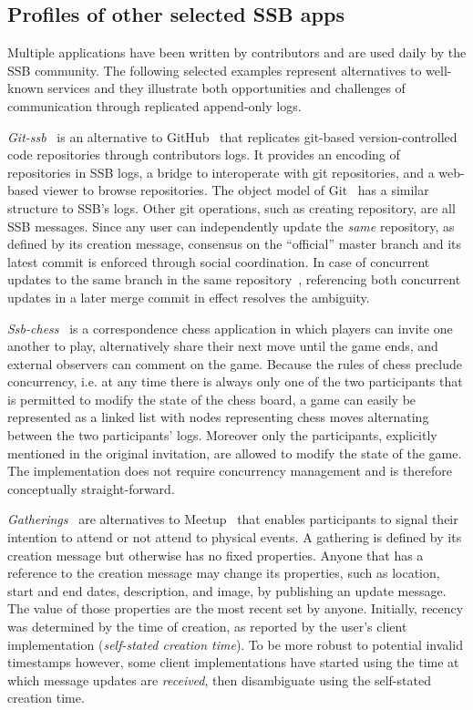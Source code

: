\documentclass[9pt,sigconf]{acmart}
\begin{document}
\subsection{Profiles of other selected SSB apps}
\label{Section:AppProfiles}

Multiple applications have been written by contributors and are used daily by
the SSB community. The following selected examples represent
alternatives to well-known services and they illustrate both opportunities and
challenges of communication through replicated append-only logs.

\textit{Git-ssb}~\cite{git-ssb} is an alternative to GitHub~\cite{github} that
replicates git-based version-controlled code repositories through contributors
logs. It provides an encoding of repositories in SSB logs, a bridge to
interoperate with git repositories, and a web-based viewer to browse
repositories. The object model of Git~\cite{chacon2014pro} has a similar
structure to SSB's logs. Other git operations, such as creating repository, are
all SSB messages. Since any user can independently update the \textit{same} repository, as defined by its creation message, consensus on the ``official'' master branch and its latest commit is enforced
through social coordination. In case of concurrent updates to the same branch
in the same repository~\cite{git-ssb-push-conflict}, referencing both concurrent
updates in a later merge commit in effect resolves
the ambiguity.

\textit{Ssb-chess}~\cite{ssb-chess} is a correspondence chess application in
which players can invite one another to play, alternatively share their next
move until the game ends, and external observers can comment on the game.
Because the rules of chess preclude concurrency,  i.e. at any time there is always
 only one of the two participants that is permitted to modify the state of the chess board,
 a game can easily be represented as a linked list with nodes
representing chess moves alternating between the two participants' logs.
Moreover only the participants, explicitly mentioned in the original invitation, are
allowed to modify the state of the game. The implementation does not require
concurrency management and is therefore conceptually straight-forward.

\textit{Gatherings}~\cite{patch-gatherings} are alternatives to
Meetup~\cite{meetup.com} that enables participants to signal their intention to
attend or not attend to physical events. A gathering is defined by its creation message
but otherwise has no fixed properties. Anyone that has a reference to the creation message may
change its properties, such as location, start and end dates, description, and
image, by publishing an update message. The value of those properties are the
most recent set by anyone. Initially, recency was determined by the time of
creation, as reported by the user's client implementation (\textit{self-stated
creation time}). To be more robust to potential invalid
timestamps however, some client implementations have started using the time at
which message updates are \textit{received}, then disambiguate using the
self-stated creation time.
\end{document}
